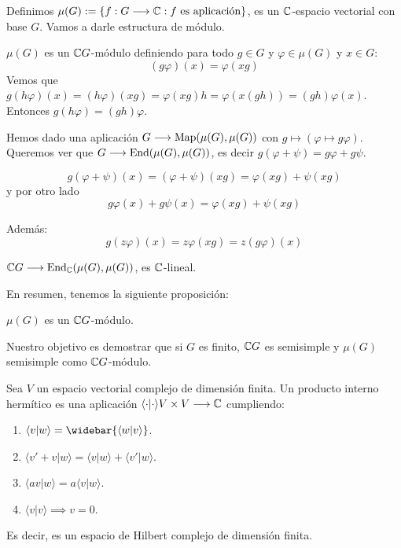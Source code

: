 Definimos \(\mu(G):=\{f:G\longrightarrow\mathbb{C}:f\textrm{ es aplicación}\}\),
es un \(\mathbb{C}\)-espacio vectorial con base \(G\). Vamos a darle estructura
de módulo.

\(\mu(G)\) es un \(\mathbb{C} G\)-módulo definiendo para todo \(g\in G\) y
\(\varphi\in\mu(G)\) y \(x\in G\):
\[
  (g\varphi)(x) = \varphi(xg)
\]
Vemos que \(g(h\varphi)(x)=(h\varphi)(xg)=\varphi(xg)h=\varphi(x(gh))=
(gh)\varphi(x)\). Entonces \(g(h\varphi)=(gh)\varphi\).

Hemos dado una aplicación \(G\longrightarrow\operatorname{Map}(\mu(G),\mu(G))\)
con \(g\mapsto(\varphi\mapsto g\varphi)\). Queremos ver que
\(G\longrightarrow\operatorname{End}(\mu(G),\mu(G))\), es decir
\(g(\varphi+\psi)=g\varphi+g\psi\).

\[
  g(\varphi+\psi)(x)=(\varphi+\psi)(xg)=\varphi(xg)+\psi(xg)
\]
y por otro lado
\[
  g\varphi(x)+g\psi(x)=\varphi(xg)+\psi(xg)
\]

Además:
\[
  g(z\varphi)(x)=z\varphi(xg)=z(g\varphi)(x)
\]

\(\mathbb{C} G\longrightarrow\operatorname{End}_{\mathbb{C}}(\mu(G),\mu(G))\), es \(\mathbb{C}\)-lineal.

En resumen, tenemos la siguiente proposición:

\begin{prop}
\(\mu(G)\) es un \(\mathbb{C} G\)-módulo.
\end{prop}

Nuestro objetivo es demostrar que si \(G\) es finito, \(\mathbb{C} G\) es semisimple
y \(\mu(G)\) semisimple como \(\mathbb{C} G\)-módulo.

\begin{df}
  Sea \(V\) un espacio vectorial complejo de dimensión finita.
  Un producto interno hermítico es una aplicación
  \(\langle\cdot|\cdot\rangle V\times V\longrightarrow \mathbb{C}\) cumpliendo:
  \begin{enumerate}
    \item \(\langle v|w\rangle=\widebar{\langle w|v\rangle}\).
    \item \(\langle v'+v|w\rangle=\langle v|w\rangle+\langle v'|w\rangle\).
    \item \(\langle av|w\rangle=a\langle v|w\rangle\).
    \item \(\langle v| v\rangle\implies v=0\).
  \end{enumerate}
  Es decir, es un espacio de Hilbert complejo de dimensión finita.
\end{df}



